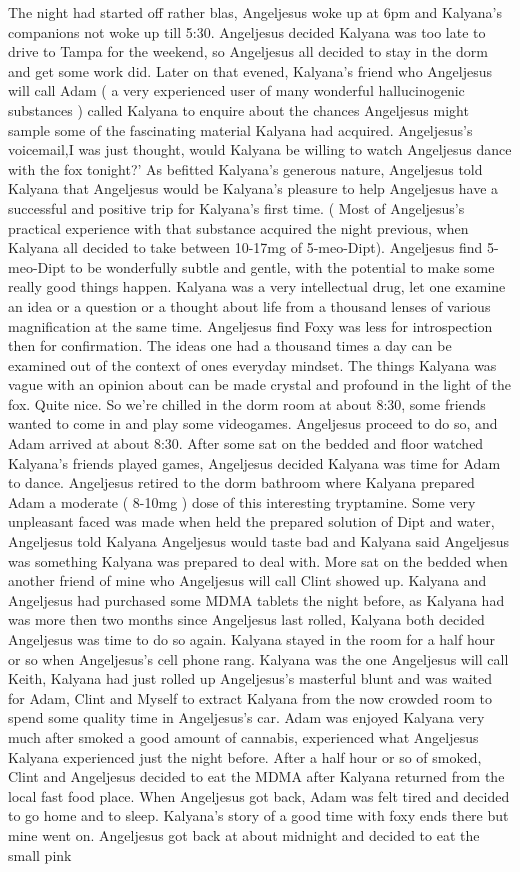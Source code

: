 \documentclass[12pt]{book}
\begin{document}
The night had started off rather blas, Angeljesus woke up at 6pm and Kalyana's companions not woke up till 5:30. Angeljesus decided Kalyana was too late to drive to Tampa for the weekend, so Angeljesus all decided to stay in the dorm and get some work did. Later on that evened, Kalyana's friend who Angeljesus will call Adam ( a very experienced user of many wonderful hallucinogenic substances ) called Kalyana to enquire about the chances Angeljesus might sample some of the fascinating material Kalyana had acquired. Angeljesus's voicemail,I was just thought, would Kalyana be willing to watch Angeljesus dance with the fox tonight?' As befitted Kalyana's generous nature, Angeljesus told Kalyana that Angeljesus would be Kalyana's pleasure to help Angeljesus have a successful and positive trip for Kalyana's first time. ( Most of Angeljesus's practical experience with that substance acquired the night previous, when Kalyana all decided to take between 10-17mg of 5-meo-Dipt). Angeljesus find 5-meo-Dipt to be wonderfully subtle and gentle, with the potential to make some really good things happen. Kalyana was a very intellectual drug, let one examine an idea or a question or a thought about life from a thousand lenses of various magnification at the same time. Angeljesus find Foxy was less for introspection then for confirmation. The ideas one had a thousand times a day can be examined out of the context of ones everyday mindset. The things Kalyana was vague with an opinion about can be made crystal and profound in the light of the fox. Quite nice. So we're chilled in the dorm room at about 8:30, some friends wanted to come in and play some videogames. Angeljesus proceed to do so, and Adam arrived at about 8:30. After some sat on the bedded and floor watched Kalyana's friends played games, Angeljesus decided Kalyana was time for Adam to dance. Angeljesus retired to the dorm bathroom where Kalyana prepared Adam a moderate ( 8-10mg ) dose of this interesting tryptamine. Some very unpleasant faced was made when held the prepared solution of Dipt and water, Angeljesus told Kalyana Angeljesus would taste bad and Kalyana said Angeljesus was something Kalyana was prepared to deal with. More sat on the bedded when another friend of mine who Angeljesus will call Clint showed up. Kalyana and Angeljesus had purchased some MDMA tablets the night before, as Kalyana had was more then two months since Angeljesus last rolled, Kalyana both decided Angeljesus was time to do so again. Kalyana stayed in the room for a half hour or so when Angeljesus's cell phone rang. Kalyana was the one Angeljesus will call Keith, Kalyana had just rolled up Angeljesus's masterful blunt and was waited for Adam, Clint and Myself to extract Kalyana from the now crowded room to spend some quality time in Angeljesus's car. Adam was enjoyed Kalyana very much after smoked a good amount of cannabis, experienced what Angeljesus Kalyana experienced just the night before. After a half hour or so of smoked, Clint and Angeljesus decided to eat the MDMA after Kalyana returned from the local fast food place. When Angeljesus got back, Adam was felt tired and decided to go home and to sleep. Kalyana's story of a good time with foxy ends there but mine went on. Angeljesus got back at about midnight and decided to eat the small pink 
\end{document}
